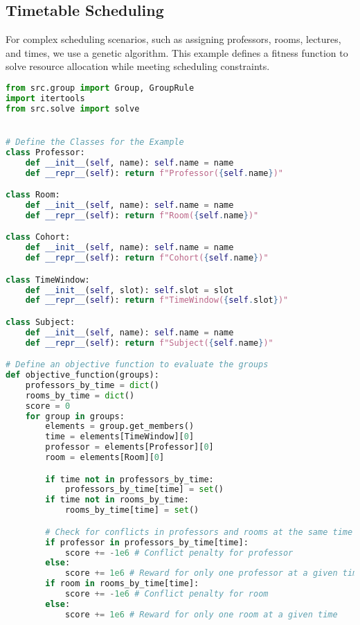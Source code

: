 \subsection{Timetable Scheduling}
For complex scheduling scenarios, such as assigning professors, rooms, lectures, and times, we use a genetic algorithm. This example defines a fitness function to solve resource allocation while meeting scheduling constraints. 

\begin{lstlisting}[language=Python, caption={Creating and solving the Timetable Scheduling Problem using this framework.}, label={script:time_table}]
from src.group import Group, GroupRule
import itertools
from src.solve import solve


# Define the Classes for the Example
class Professor:
    def __init__(self, name): self.name = name
    def __repr__(self): return f"Professor({self.name})"

class Room:
    def __init__(self, name): self.name = name
    def __repr__(self): return f"Room({self.name})"

class Cohort:
    def __init__(self, name): self.name = name
    def __repr__(self): return f"Cohort({self.name})"

class TimeWindow:
    def __init__(self, slot): self.slot = slot
    def __repr__(self): return f"TimeWindow({self.slot})"

class Subject:
    def __init__(self, name): self.name = name
    def __repr__(self): return f"Subject({self.name})"

# Define an objective function to evaluate the groups
def objective_function(groups):
    professors_by_time = dict()
    rooms_by_time = dict()
    score = 0
    for group in groups:
        elements = group.get_members()
        time = elements[TimeWindow][0]
        professor = elements[Professor][0]
        room = elements[Room][0]

        if time not in professors_by_time:
            professors_by_time[time] = set()
        if time not in rooms_by_time:
            rooms_by_time[time] = set()

        # Check for conflicts in professors and rooms at the same time
        if professor in professors_by_time[time]:
            score += -1e6 # Conflict penalty for professor
        else:
            score += 1e6 # Reward for only one professor at a given time
        if room in rooms_by_time[time]:
            score += -1e6 # Conflict penalty for room
        else:
            score += 1e6 # Reward for only one room at a given time


\end{lstlisting}
